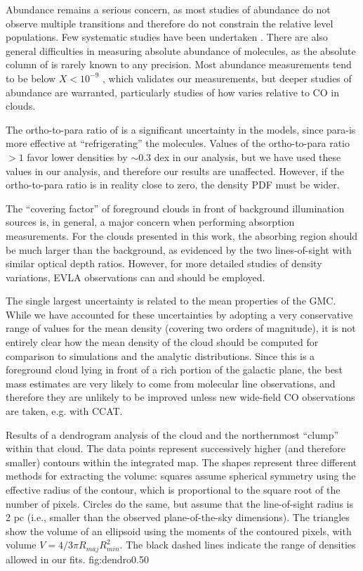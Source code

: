 Abundance remains a serious concern, as most studies of \formaldehyde abundance
do not observe multiple transitions and therefore do not constrain the relative
level populations.  Few systematic studies have been undertaken
\citep[e.g.]{Liszt2006a}.  There are also general difficulties in measuring absolute
abundance of molecules, as the absolute column of \hh is rarely known to any
precision.  Most abundance measurements tend to be below $X<10^{-9}$
\citep{Pauls1996a,Dickens1999a,Turner1989a,Turner1993a}, which validates our
measurements, but deeper studies of abundance are warranted, particularly
studies of how \formaldehyde varies relative to CO in clouds.

The ortho-to-para ratio of \hh is a significant uncertainty in the models,
since para-\hh is more effective at ``refrigerating'' the \formaldehyde
molecules.  Values of the ortho-to-para ratio $>1$ favor lower densities by
$\sim0.3$ dex in our analysis, but we have used these values in our analysis,
and therefore our results are unaffected.  However, if the ortho-to-para ratio
is in reality close to zero, the density PDF must be wider.

The ``covering factor'' of foreground clouds in front of background
illumination sources is, in general, a major concern when performing absorption
measurements.  For the clouds presented in this work, the absorbing region
should be much larger than the background, as evidenced by the two
lines-of-sight with similar optical depth ratios.  However, for more detailed
studies of density variations, EVLA observations can and should be employed.

The single largest uncertainty is related to the mean properties of the GMC.
While we have accounted for these uncertainties by adopting a very conservative
range of values for the mean density (covering two orders of magnitude), it is
not entirely clear how the mean density of the cloud should be computed for
comparison to simulations and the analytic distributions.  Since this is a
foreground cloud lying in front of a rich portion of the galactic plane, the
best mass estimates are very likely to come from molecular line observations,
and therefore they are unlikely to be improved unless new wide-field CO
observations are taken, e.g. with CCAT.

{Results of a dendrogram analysis of the \GRSMC cloud and the
northernmost \thirteenco ``clump'' within that cloud.  The data points represent
successively higher (and therefore smaller) contours within the integrated \thirteenco
map.  The shapes represent three different methods
for extracting the volume: squares assume spherical symmetry using the
effective radius of the contour, which is proportional to the square root of
the number of pixels.  Circles do the same, but assume that the line-of-sight
radius is 2 pc (i.e., smaller than the observed plane-of-the-sky
dimensions).  The triangles show the volume of an ellipsoid using the moments of the
contoured pixels, with volume $V=4/3 \pi R_{maj}R_{min}^2$.  The black dashed lines
indicate the range of densities allowed in our fits.}
{fig:dendro}{0.5}{0}


